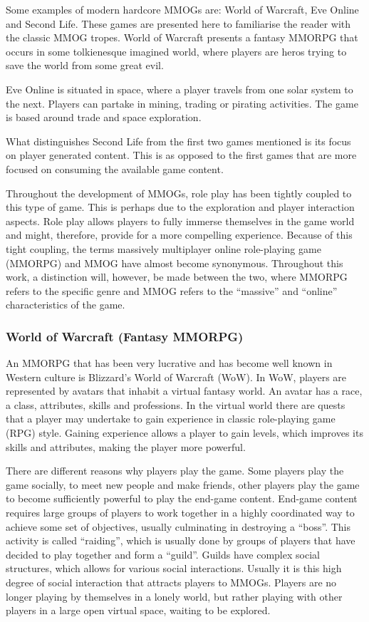 Some examples of modern hardcore MMOGs are: World of Warcraft, Eve Online and Second Life. These games are presented here to familiarise the reader with the classic MMOG tropes. World of Warcraft presents a fantasy MMORPG that occurs in some tolkienesque imagined world, where players are heros trying to save the world from some great evil.

Eve Online is situated in space, where a player travels from one solar system to the next. Players can partake in mining, trading or pirating activities. The game is based around trade and space exploration.

What distinguishes Second Life from the first two games mentioned is its focus on player generated content. This is as opposed to the first games that are more focused on consuming the available game content.

Throughout the development of MMOGs, role play has been tightly coupled to this type of game. This is perhaps due to the exploration and player interaction aspects. Role play allows players to fully immerse themselves in the game world and might, therefore, provide for a more compelling experience. Because of this tight coupling, the terms massively multiplayer online role-playing game (MMORPG) and MMOG have almost become synonymous. Throughout this work, a distinction will, however, be made between the two, where MMORPG refers to the specific genre and MMOG refers to the ``massive'' and ``online'' characteristics of the game.

\subsubsection{World of Warcraft (Fantasy MMORPG)}

An MMORPG that has been very lucrative and has become well known in Western culture is Blizzard's World of Warcraft (WoW). In WoW, players are represented by avatars that inhabit a virtual fantasy world. An avatar has a race, a class, attributes, skills and professions. In the virtual world there are quests that a player may undertake to gain experience in classic role-playing game (RPG) style. Gaining experience allows a player to gain levels, which improves its skills and attributes, making the player more powerful.

There are different reasons why players play the game. Some players play the game socially, to meet new people and make friends, other players play the game to become sufficiently powerful to play the end-game content. End-game content requires large groups of players to work together in a highly coordinated way to achieve some set of objectives, usually culminating in destroying a ``boss''. This activity is called ``raiding'', which is usually done by groups of players that have decided to play together and form a ``guild''. Guilds have complex social structures, which allows for various social interactions. Usually it is this high degree of social interaction that attracts players to MMOGs. Players are no longer playing by themselves in a lonely world, but rather playing with other players in a large open virtual space, waiting to be explored.

